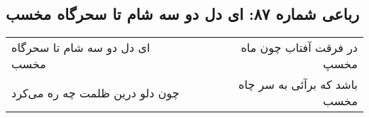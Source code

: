 \begin{center}
\section*{رباعی شماره ۸۷: ای دل دو سه شام تا سحرگاه مخسب}
\label{sec:0087}
\begin{longtable}{l p{0.5cm} r}
ای دل دو سه شام تا سحرگاه مخسب
&&
در فرقت آفتاب چون ماه مخسپ
\\
چون دلو درین ظلمت چه ره می‌کرد
&&
باشد که برآئی به سر چاه مخسب
\\
\end{longtable}
\end{center}
